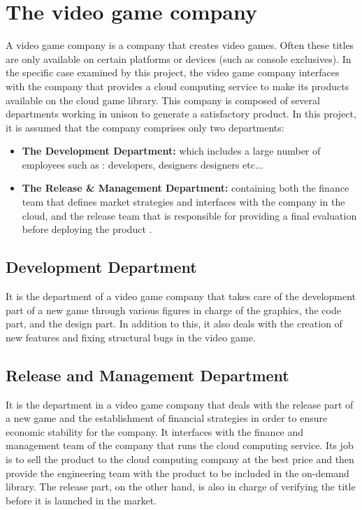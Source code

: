 \documentclass[a4paper,12pt]{report}
\begin{document}
\section{The video game company }
A video game company is a company that creates video games. Often these titles are only available on certain platforms or devices (such as console exclusives). In the specific case examined by this project, the video game company interfaces with the company that provides a cloud computing service to make its products available on the cloud game library. This company is composed of several departments working in unison to generate a satisfactory product. In this project, it is assumed that the company comprises only two departments:
\begin{itemize}
\item{\textbf{The Development Department:} which includes a large number of employees such as : developers, designers designers etc...}
\item{\textbf{The Release \& Management Department:} containing both the finance team that defines market strategies and interfaces with the company in the cloud, and the release team that is responsible for providing a final evaluation before deploying the product .}
\end{itemize}
%
\subsection{Development Department }
It is the department of a video game company that takes care of the development part of a new game through various figures in charge of the graphics, the code part, and the design part. In addition to this, it also deals with the creation of new features and fixing structural bugs in the video game.
%
\subsection{Release and Management Department }
It is the department in a video game company that deals with the release part of a new game and the establishment of financial strategies in order to ensure economic stability for the company. It interfaces with the finance and management team of the company that runs the cloud computing service. Its job is to sell the product to the cloud computing company at the best price and then provide the engineering team with the product to be included in the on-demand library. The release part, on the other hand, is also in charge of verifying the title before it is launched in the market.
%
%
\end{document}
